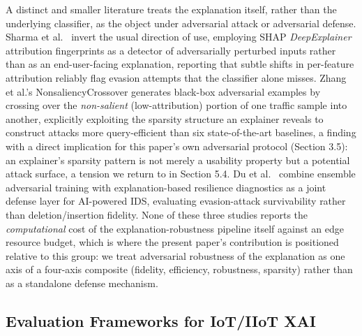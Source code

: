 A distinct and smaller literature treats the explanation itself, rather than the underlying classifier, as the object under adversarial attack or adversarial defense. Sharma et al.~\citep{ref33} invert the usual direction of use, employing SHAP \emph{DeepExplainer} attribution fingerprints as a detector of adversarially perturbed inputs rather than as an end-user-facing explanation, reporting that subtle shifts in per-feature attribution reliably flag evasion attempts that the classifier alone misses. Zhang et al.'s NonsaliencyCrossover \citep{ref32} generates black-box adversarial examples by crossing over the \emph{non-salient} (low-attribution) portion of one traffic sample into another, explicitly exploiting the sparsity structure an explainer reveals to construct attacks more query-efficient than six state-of-the-art baselines, a finding with a direct implication for this paper's own adversarial protocol (Section 3.5): an explainer's sparsity pattern is not merely a usability property but a potential attack surface, a tension we return to in Section 5.4. Du et al.~\citep{ref34} combine ensemble adversarial training with explanation-based resilience diagnostics as a joint defense layer for AI-powered IDS, evaluating evasion-attack survivability rather than deletion/insertion fidelity. None of these three studies reports the \emph{computational} cost of the explanation-robustness pipeline itself against an edge resource budget, which is where the present paper's contribution is positioned relative to this group: we treat adversarial robustness of the explanation as one axis of a four-axis composite (fidelity, efficiency, robustness, sparsity) rather than as a standalone defense mechanism.

\subsection{Evaluation Frameworks for IoT/IIoT XAI}\label{evaluation-frameworks-for-iotiiot-xai}

